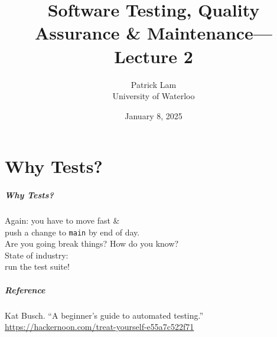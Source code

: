 \documentclass{beamer}
\title{Software Testing, Quality Assurance \& Maintenance---Lecture 2}
\author{Patrick Lam\\University of Waterloo}
\date{January 8, 2025}
\begin{document}
\begin{frame}
  \titlepage
\end{frame}

\part{Why Tests?}
\begin{frame}
  \partpage
\end{frame}


\begin{frame}
  \frametitle{Why Tests?}
  \begin{center}
    \Large Again: you have to move fast \& \\
    push a change to {\tt main} by end of day.\\[1em]
    Are you going break things? How do you know?\\[2em]
    \Huge \alert{State of industry: \\ run the test suite!}
  \end{center}
\end{frame}

\begin{frame}
  \frametitle{Reference}
  \begin{center}
    \Large
Kat Busch. ``A beginner's guide to automated testing.'' \\
\url{https://hackernoon.com/treat-yourself-e55a7c522f71}
  \end{center}
\end{frame}
\end{document}
